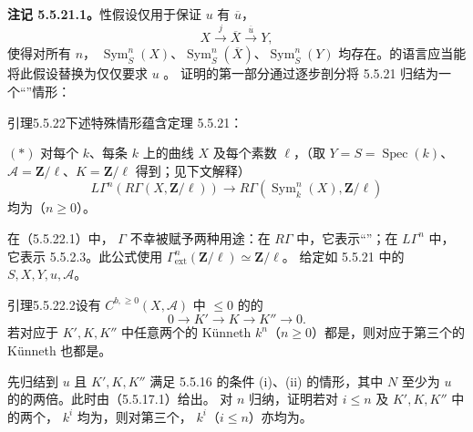 \textbf{注记 5.5.21.1。}性假设仅用于保证 $u$ 有 $\overline u$，
\[X\xrightarrow j\overline X\xrightarrow{\overline u}Y,\]
使得对所有 $n$， $\operatorname{Sym}^n_S(X)$、$\operatorname{Sym}^n_S(\overline X)$、$\operatorname{Sym}^n_S(Y)$ 均存在。的语言应当能将此假设替换为仅仅要求 $u$ 。
证明的第一部分通过逐步剖分将 5.5.21 归结为一个“”情形：
\begin{SGAresult}{引理}{5.5.22}下述特殊情形蕴含定理 5.5.21：

$(*)$ 对每个 $k$、每条 $k$ 上的曲线 $X$ 及每个素数 $\ell$，（取 $Y=S=\operatorname{Spec}(k)$、$\mathscr A=\mathbf Z/\ell$、$K=\mathbf Z/\ell$ 得到；见下文解释）
\begin{equation}\tag{5.5.22.1}L\Gamma^n(R\Gamma(X,\mathbf Z/\ell))\longrightarrow R\Gamma(\operatorname{Sym}^n_k(X),\mathbf Z/\ell)\end{equation}
均为（$n\geq0$）。
\end{SGAresult}
在（5.5.22.1）中， $\Gamma$ 不幸被赋予两种用途：在 $R\Gamma$ 中，它表示“”；在 $L\Gamma^n$ 中，它表示 5.5.2.3。此公式使用 $\Gamma^n_{\mathrm{ext}}(\mathbf Z/\ell)\simeq\mathbf Z/\ell$。
给定如 5.5.21 中的 $S,X,Y,u,\mathscr A$。
\begin{SGAresult}{引理}{5.5.22.2}设有 $C^{b,\geq0}(X,\mathscr A)$ 中  $\leq0$ 的的
\[0\longrightarrow K'\longrightarrow K\longrightarrow K''\longrightarrow0.\]
若对应于 $K',K,K''$ 中任意两个的 Künneth  $k^n$（$n\geq0$）都是，则对应于第三个的 Künneth 也都是。
\end{SGAresult}
先归结到 $u$ 且 $K',K,K''$ 满足 5.5.16 的条件 (i)、(ii) 的情形，其中 $N$ 至少为 $u$ 的的两倍。此时由（5.5.17.1）给出。
对 $n$ 归纳，证明若对 $i\leq n$ 及 $K',K,K''$ 中的两个， $k^i$ 均为，则对第三个， $k^i$（$i\leq n$）亦均为。
